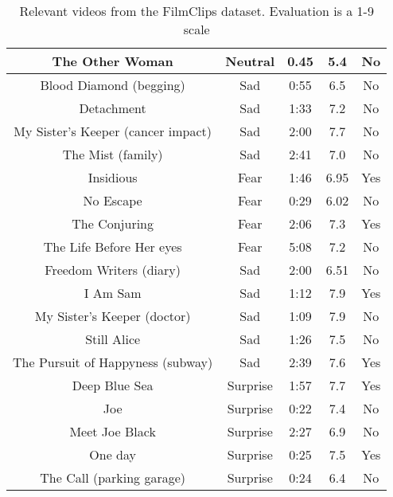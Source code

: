 \begin{table}[]
\begin{tabular}{|c|c|c|c|c|}
          The Other Woman & Neutral & 0.45 & 5.4  & No \\ \hline
          Blood Diamond (begging) & Sad & 0:55 & 6.5  & No \\ \hline
          Detachment & Sad & 1:33 & 7.2  & No \\ \hline
          My Sister's Keeper (cancer impact) & Sad & 2:00 & 7.7  & No \\ \hline
          The Mist (family) & Sad & 2:41 & 7.0  & No \\ \hline
          Insidious & Fear & 1:46 & 6.95  & Yes \\ \hline
          No Escape & Fear & 0:29 & 6.02  & No \\ \hline
          The Conjuring & Fear & 2:06 & 7.3  & Yes \\ \hline
          The Life Before Her eyes & Fear & 5:08 & 7.2  & No \\ \hline
          Freedom Writers (diary) & Sad & 2:00 & 6.51  & No \\ \hline
          I Am Sam & Sad & 1:12 & 7.9  & Yes \\ \hline
          My Sister's Keeper (doctor)  & Sad & 1:09 & 7.9  & No \\ \hline
          Still Alice & Sad & 1:26 & 7.5  & No \\ \hline
          The Pursuit of Happyness (subway) & Sad & 2:39 & 7.6  & Yes \\ \hline
          Deep Blue Sea & Surprise & 1:57 & 7.7  & Yes \\ \hline
          Joe & Surprise & 0:22 & 7.4  & No \\ \hline
          Meet Joe Black & Surprise & 2:27 & 6.9  & No \\ \hline
          One day & Surprise & 0:25 & 7.5  & Yes \\ \hline
          The Call (parking garage) & Surprise & 0:24 & 6.4  & No \\ \hline
    \end{tabular}
    \caption{Relevant videos from the FilmClips dataset. Evaluation is a 1-9 scale \cite{FilmClips}}
    \label{tab:my_label}
\end{table}


